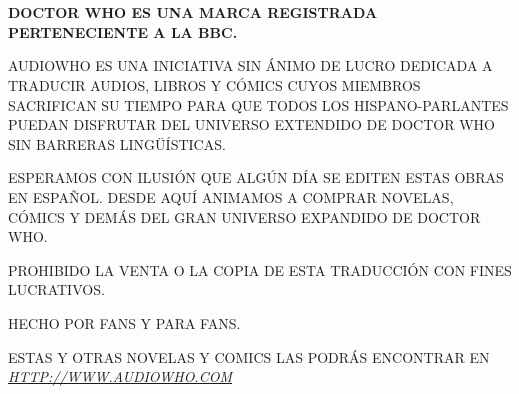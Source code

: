 \chapter*{}
\vfill
\begin{center}

\textbf{DOCTOR WHO ES UNA MARCA REGISTRADA PERTENECIENTE A LA BBC.}

\vspace{2mm}

AUDIOWHO ES UNA INICIATIVA SIN ÁNIMO DE LUCRO DEDICADA A TRADUCIR AUDIOS, LIBROS
Y CÓMICS CUYOS MIEMBROS SACRIFICAN SU TIEMPO PARA QUE TODOS LOS
HISPANO-PARLANTES PUEDAN DISFRUTAR DEL UNIVERSO EXTENDIDO DE DOCTOR
WHO SIN BARRERAS LINGÜÍSTICAS.

\vspace{2mm}

ESPERAMOS CON ILUSIÓN QUE ALGÚN DÍA SE EDITEN ESTAS OBRAS EN ESPAÑOL. DESDE AQUÍ
ANIMAMOS A COMPRAR NOVELAS, CÓMICS Y DEMÁS DEL GRAN UNIVERSO EXPANDIDO DE DOCTOR
WHO.

\vspace{2mm}

PROHIBIDO LA VENTA O LA COPIA DE ESTA TRADUCCIÓN CON FINES LUCRATIVOS.

\vspace{2mm}

HECHO POR FANS Y PARA FANS.

\vspace{2mm}

ESTAS Y OTRAS NOVELAS Y COMICS LAS PODRÁS ENCONTRAR EN
\href{http://www.audiowho.com}{\textit{HTTP://WWW.AUDIOWHO.COM}}
\end{center}
